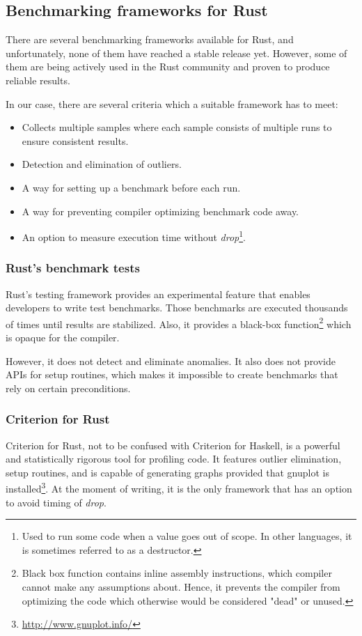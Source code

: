 \subsection{Benchmarking frameworks for Rust}
There are several benchmarking frameworks available for Rust, and unfortunately, none of them have reached a stable release yet. However, some of them are being actively used in the Rust community and proven to produce reliable results.  

In our case, there are several criteria which a suitable framework has to meet:
\begin{itemize}
    \item Collects multiple samples where each sample consists of multiple runs to ensure consistent results. 
    \item Detection and elimination of outliers.     
    \item A way for setting up a benchmark before each run. 
    \item A way for preventing compiler optimizing benchmark code away.     
    \item An option to measure execution time without \emph{drop}\footnote{Used to run some code when a value goes out of scope. In other languages, it is sometimes referred to as a destructor.}.
\end{itemize}

\subsubsection*{Rust's benchmark tests}
Rust's testing framework provides an experimental feature that enables developers to write test benchmarks. Those benchmarks are executed thousands of times until results are stabilized. Also, it provides a black-box function\footnote{Black box function contains inline assembly instructions, which compiler cannot make any assumptions about. Hence, it prevents the compiler from optimizing the code which otherwise would be considered "dead" or unused.} which is opaque for the compiler. 

However, it does not detect and eliminate anomalies. It also does not provide APIs for setup routines, which makes it impossible to create benchmarks that rely on certain preconditions.

\subsubsection*{Criterion for Rust}
Criterion for Rust, not to be confused with Criterion for Haskell, is a powerful and statistically rigorous tool for profiling code. It features outlier elimination, setup routines, and is capable of generating graphs provided that gnuplot is installed\footnote{\url{http://www.gnuplot.info/}}. At the moment of writing, it is the only framework that has an option to avoid timing of \emph{drop}. 

